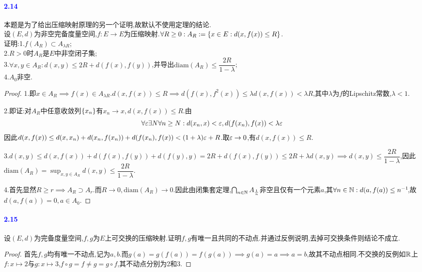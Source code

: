 \documentclass[UTF8]{article}
\newcommand{\parablue}[1]{\paragraph*{\textcolor{blue}{#1}}}
\begin{document}
\parablue{2.14}本题是为了给出压缩映射原理的另一个证明,故默认不使用定理的结论.\\ 设$(E,d)$为非空完备度量空间,$f:E\to E$为压缩映射.$\forall R\geq 0:A_R:=\left\{x\in E:d(x,f(x))\leq R\right\}$.\\
证明:1.$f(A_R)\subset A_{\lambda R}$;\\
2.$R>0$时$A_R$是$E$中非空闭子集;\\
3.$\forall x,y\in A_R:d(x,y)\leq 2R+d(f(x),f(y))$,并导出$\mathrm{diam}(A_R)\leq \dfrac{2R}{1-\lambda}$;\\
4.$A_0$非空.
\begin{proof}
    1.即$x\in A_R\implies f(x)\in A_{\lambda R}$.$d(x,f(x))\leq R\implies d(f(x),f^2(x))\leq \lambda d(x,f(x))<\lambda R$,其中$\lambda$为$f$的Lipschitz常数,$\lambda<1$.

    2.即证:对$A_R$中任意收敛列$\left\{x_n\right\}$有$x_n\to x,d(x,f(x))\leq R$.由$$\forall \varepsilon\exists N\forall n\geq N:d(x_n,x)<\varepsilon, d(f(x_n),f(x))<\lambda \varepsilon$$
    因此$d(x,f(x))\leq d(x,x_n)+d(x_n,f(x_n))+d(f(x_n),f(x))<(1+\lambda)\varepsilon+R$.取$\varepsilon\to 0$,有$d(x,f(x))\leq R$.

    3.$d(x,y)\leq d(x,f(x))+d(f(x),f(y))+d(f(y),y)=2R+d(f(x),f(y))\leq 2R+\lambda d(x,y)\implies d(x,y)\leq \dfrac{2R}{1-\lambda}$,因此$\mathrm{diam}(A_R)=\sup_{x,y\in A_R}d(x,y)\leq \dfrac{2R}{1-\lambda}$.

    4.首先显然$R\geq r\implies A_R\supset A_r$.而$R\to 0,\mathrm{diam}(A_R)\to 0$.因此由闭集套定理,$\bigcap_{n\in \mathbb{N}}A_{\frac{1}{n}}$非空且仅有一个元素$a$,其$\forall n\in \mathbb{N}:d(a,f(a))\leq n^{-1}\!$,故$d(a,f(a))=0,a\in A_0$.
\end{proof}

\parablue{2.15}设$(E,d)$为完备度量空间,$f,g$为$E$上可交换的压缩映射.证明$f,g$有唯一且共同的不动点.并通过反例说明,去掉可交换条件则结论不成立.
\begin{proof}
    首先$f,g$均有唯一不动点,记为$a,b$.而$g(a)=g(f(a))=f(g(a))\implies g(a)=a\implies a=b$,故其不动点相同.不交换的反例如$\mathbb{R}$上$f:x\mapsto 2$与$g:x\mapsto 3$,$f\circ g=f\neq g=g\circ f$,其不动点分别为2和3.
\end{proof}
\end{document}

